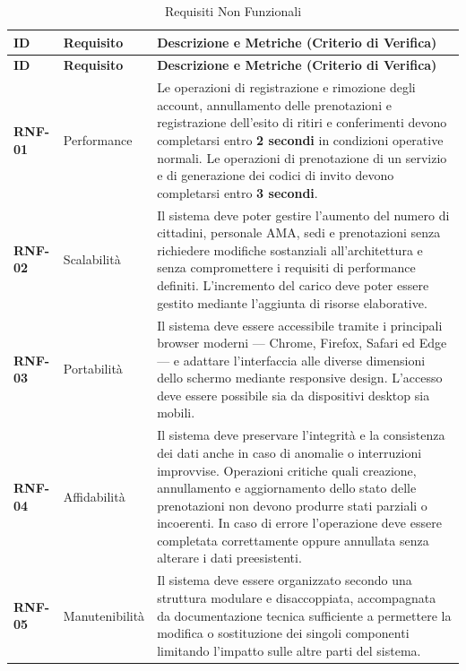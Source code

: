 \begin{center}
\renewcommand{\arraystretch}{1.3}
\begin{longtable}{|p{1.8cm}|p{3.2cm}|p{9.0cm}|}
\caption{Requisiti Non Funzionali}\label{tab:rnf} \\ \hline
\rowcolor{tableheader} \textbf{ID} & \textbf{Requisito} & \textbf{Descrizione e Metriche (Criterio di Verifica)} \\ \hline
\endfirsthead

\hline
\rowcolor{tableheader} \textbf{ID} & \textbf{Requisito} & \textbf{Descrizione e Metriche (Criterio di Verifica)} \\ \hline
\endhead

\textbf{RNF-01} & Performance & Le operazioni di registrazione e rimozione degli account, annullamento delle prenotazioni e registrazione dell'esito di ritiri e conferimenti devono completarsi entro \textbf{2 secondi} in condizioni operative normali. Le operazioni di prenotazione di un servizio e di generazione dei codici di invito devono completarsi entro \textbf{3 secondi}. \\ \hline

\textbf{RNF-02} & Scalabilità & Il sistema deve poter gestire l'aumento del numero di cittadini, personale AMA, sedi e prenotazioni senza richiedere modifiche sostanziali all'architettura e senza compromettere i requisiti di performance definiti. L'incremento del carico deve poter essere gestito mediante l'aggiunta di risorse elaborative. \\ \hline

\textbf{RNF-03} & Portabilità & Il sistema deve essere accessibile tramite i principali browser moderni — Chrome, Firefox, Safari ed Edge — e adattare l'interfaccia alle diverse dimensioni dello schermo mediante responsive design. L'accesso deve essere possibile sia da dispositivi desktop sia mobili. \\ \hline

\textbf{RNF-04} & Affidabilità & Il sistema deve preservare l'integrità e la consistenza dei dati anche in caso di anomalie o interruzioni improvvise. Operazioni critiche quali creazione, annullamento e aggiornamento dello stato delle prenotazioni non devono produrre stati parziali o incoerenti. In caso di errore l'operazione deve essere completata correttamente oppure annullata senza alterare i dati preesistenti. \\ \hline

\textbf{RNF-05} & Manutenibilità & Il sistema deve essere organizzato secondo una struttura modulare e disaccoppiata, accompagnata da documentazione tecnica sufficiente a permettere la modifica o sostituzione dei singoli componenti limitando l'impatto sulle altre parti del sistema. \\ \hline


\end{longtable}
\end{center}
